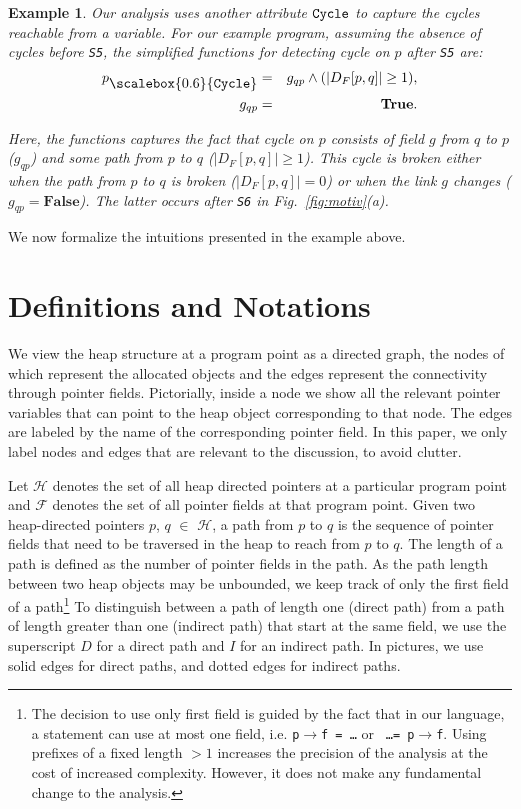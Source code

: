 \documentclass[letterpaper]{sig-alternate}
\newtheorem{example}{Example}
\newcommand{\p}{\ensuremath{p}}
\newcommand{\q}{\ensuremath{q}}
\newcommand{\drct}{\ensuremath{D}}
\newcommand{\indrct}{\ensuremath{I}}
\newcommand{\heap}{\ensuremath{\mathcal{H}}}
\newcommand{\fields}{\ensuremath{\mathcal{F}}}
\newcommand{\subC}{\mbox{\scalebox{0.6}{\Cycle}}}
\newcommand{\num}[1]{\ensuremath{|#1|}}
\newcommand{\DFM}[2]{\ensuremath{D_F[#1,#2]}}
\newcommand{\Cycle}{{\tt Cycle}}
\newcommand{\false}{\textbf{False}}
\newcommand{\true}{\textbf{True}}
\begin{document}
\begin{example}
{Our analysis uses another attribute ${\Cycle}$ to capture the
cycles reachable from a variable. For our example program,
assuming the absence of cycles before {\tt  S5}, the
simplified functions for detecting cycle on $\p$ after
{\tt S5} are:
\begin{eqnarray*}
p_{\subC} &=& g_{qp} \wedge (\num{\DFM{p}{q}} \geq 1), \\
g_{qp}    &=& \true.
\end{eqnarray*}

Here, the functions captures the fact that cycle on $\p$
 consists of field $g$ from $\q$ to $\p$ ($g_{qp}$)
and some path from $\p$ to $\q$ ($\num{\DFM{p}{q}} \geq
1$). This cycle is broken either when the path from $\p$
to $\q$ is broken ($\num{\DFM{p}{q}} = 0$) or when the link $g$
changes ($g_{qp} = \false$). The latter occurs after
{\tt S6} in Fig.~\ref{fig:motiv}(a).  
}
\hfill\psframebox{}  
\end{example}

We now formalize the intuitions presented in the example
above.

\section{Definitions and Notations} \label{sec:Formal_Definitions}

We view the heap structure at a program point as a directed
graph, the nodes of which represent the allocated objects and
the edges represent the connectivity through pointer fields.
Pictorially, inside a node we show all the relevant pointer
variables that can point to the heap object corresponding to
that node. The edges are labeled by the name of the
corresponding pointer field. In this paper, we only label
nodes and edges that are relevant to the discussion, to avoid
clutter.

Let $\heap$ denotes the set of all heap directed pointers at
a particular program point and $\fields$ denotes the set of
all pointer fields at that program point.  Given two
heap-directed pointers $\p$, $\q$ $\in$ $\heap$, a path from
$\p$ to $\q$ is the sequence of pointer fields that need to
be traversed in the heap to reach from $\p$ to $\q$. The
length of a path is defined as the number of pointer fields
in the path. As the path length between two heap objects may
be unbounded, we keep track of only the first field of a
path\footnote{ The decision to use only first field is guided
  by the fact that in our language, a statement can use at
  most one field, i.e. {\tt p$\rightarrow$f = \ldots} or {\tt
    \ldots = p$\rightarrow$f}.  Using
  prefixes of a fixed length $> 1$ increases the
  precision of the analysis at the cost of increased
  complexity. However, it does not make any
  fundamental change to the analysis.}  To
distinguish between a path of length one (direct path) from a
path of length greater than one (indirect path) that start at
the same field, we use the superscript $\drct$ for a direct
path and $\indrct$ for an indirect path. In pictures, we use
solid edges for direct paths, and dotted edges for indirect
paths.
\end{document}
